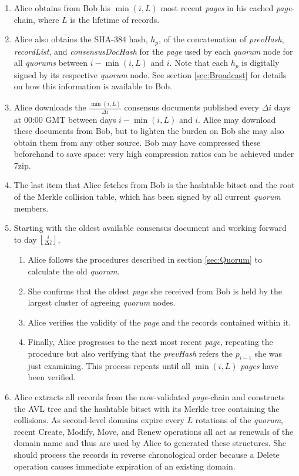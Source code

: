 \begin{enumerate}
	\item Alice obtains from Bob his $ \min(i,L) $ most recent \emph{pages} in his cached \emph{page}-chain, where $ L $ is the lifetime of records.
	\item Alice also obtains the SHA-384 hash, $ h_{p} $, of the concatenation of \emph{prevHash}, \emph{recordList}, and \emph{consensusDocHash} for the \emph{page} used by each \emph{quorum} node for all \emph{quorums} between $ i - \min(i,L) $ and $ i $. Note that each $ h_{p} $ is digitally signed by its respective \emph{quorum} node. See section \ref{sec:Broadcast} for details on how this information is available to Bob.
	\item Alice downloads the $ \frac{\min(i,L)}{\Delta i} $ consensus documents published every $ \Delta i $ days at 00:00 GMT between days $ i - \min(i,L) $ and $ i $. Alice may download these documents from Bob, but to lighten the burden on Bob she may also obtain them from any other source. Bob may have compressed these beforehand to save space: very high compression ratios can be achieved under 7zip.
	\item The last item that Alice fetches from Bob is the hashtable bitset and the root of the Merkle collision table, which has been signed by all current \emph{quorum} members.
	\item Starting with the oldest available consensus document and working forward to day $ \floor[\big]{\frac{i}{\Delta i}} $, 
		\begin{enumerate}
			\item Alice follows the procedures described in section \ref{sec:Quorum} to calculate the old \emph{quorum}.
			\item She confirms that the oldest \emph{page} she received from Bob is held by the largest cluster of agreeing \emph{quorum} nodes.
			\item Alice verifies the validity of the \emph{page} and the records contained within it.
			\item Finally, Alice progresses to the next most recent \emph{page}, repeating the procedure but also verifying that the \emph{prevHash} refers the $ p_{i - 1} $ she was just examining. This process repeats until all $ \min(i,L) $ \emph{pages} have been verified.
		\end{enumerate}
	\item Alice extracts all records from the now-validated \emph{page}-chain and constructs the AVL tree and the hashtable bitset with its Merkle tree containing the collisions. As second-level domains expire every $ L $ rotations of the \emph{quorum}, recent Create, Modify, Move, and Renew operations all act as renewals of the domain name and thus are used by Alice to generated these structures. She should process the records in reverse chronological order because a Delete operation causes immediate expiration of an existing domain.

\end{enumerate}
